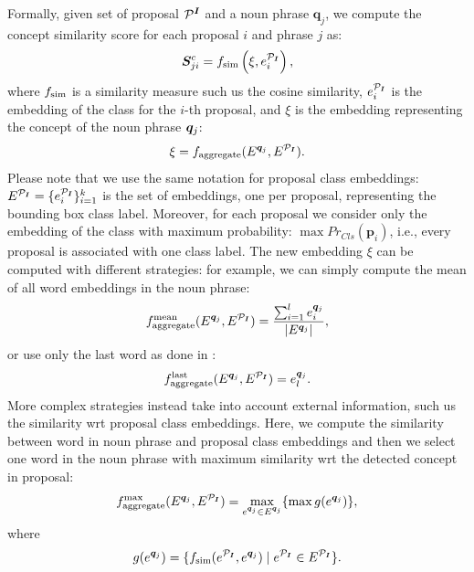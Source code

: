 Formally, given set of proposal $\mathcal{P}^{\bm{I}}$ and a noun phrase
$\bm{q}_j$, we compute the concept similarity score for each proposal
$i$ and phrase $j$ as:
\begin{equation}
  \bm{S}^c_{ji} = f_{\text{sim}} \left( \xi, e^{\mathcal{P}_{\bm{I}}}_i \right),
\end{equation}
where $f_{\text{sim}}$ is a similarity measure such us the cosine similarity,
$e^{\mathcal{P}_{\bm{I}}}_i$ is the embedding of the class for the $i$-th proposal, and
$\xi$ is the embedding representing the concept of the noun phrase
$\bm{q}_j$:
\begin{equation}
  \xi = f_{\text{aggregate}}(E^{\bm{q}_j}, E^{\mathcal{P}_{\bm{I}}}).
\end{equation}
Please note that we use the same notation for proposal class
embeddings: $E^{\mathcal{P}_{\bm{I}}} = \{ e^{\mathcal{P}_{\bm{I}}}_i \}^{k}_{i=1}$ is the set of embeddings,
one per proposal, representing the bounding box class label. Moreover,
for each proposal we consider only the embedding of the class with
maximum probability: $\max Pr_{Cls} (\bm{p}_i)$, i.e., every proposal
is associated with one class label.  The new embedding $\xi$ can be computed with different
strategies: for example, we can simply compute the mean of all word
embeddings in the noun phrase:
\begin{equation}
  f_{\text{aggregate}}^{\text{mean}}(E^{\bm{q}_j}, E^{\mathcal{P}_{\bm{I}}}) = \frac{\sum^l_{i=1} e^{\bm{q}_j}_i}{| E^{\bm{q}_j} |},
\end{equation}
or use only the last word as done in :
\begin{equation}
  f_{\text{aggregate}}^{\text{last}}(E^{\bm{q}_j}, E^{\mathcal{P}_{\bm{I}}}) = e^{\bm{q}_j}_l.
\end{equation}
More complex strategies instead take into account external
information, such us the similarity wrt proposal class embeddings.
Here, we compute the similarity between word in noun phrase and
proposal class embeddings and then we select one word in the noun
phrase with maximum similarity wrt the detected concept in proposal:
\begin{equation}
  f_{\text{aggregate}}^{\text{max}}(E^{\bm{q}_j}, E^{\mathcal{P}_{\bm{I}}}) = \max_{e^{\bm{q}_j} \in E^{\bm{q}_j}} \{ \max g(e^{\bm{q}_j}) \},
\end{equation}
where
\begin{equation}
  g(e^{\bm{q}_j}) = \{ f_{\text{sim}}(e^{\mathcal{P}_{\bm{I}}}, e^{\bm{q}_j}) \mid e^{\mathcal{P}_{\bm{I}}} \in E^{\mathcal{P}_{\bm{I}}} \}.
\end{equation}
